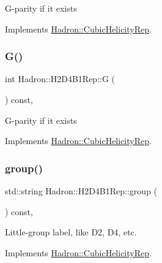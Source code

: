 G-\/parity if it exists 

Implements \mbox{\hyperlink{structHadron_1_1CubicHelicityRep_a50689f42be1e6170aa8cf6ad0597018b}{Hadron\+::\+Cubic\+Helicity\+Rep}}.

\mbox{\label{structHadron_1_1H2D4B1Rep_a327c671d4dca8693f717827d478e03aa}} 
\subsubsection{\texorpdfstring{G()}{G()}\hspace{0.1cm}{\footnotesize\ttfamily [2/2]}}
{\footnotesize\ttfamily int Hadron\+::\+H2\+D4\+B1\+Rep\+::G (\begin{DoxyParamCaption}{ }\end{DoxyParamCaption}) const\hspace{0.3cm}{\ttfamily [inline]}, {\ttfamily [virtual]}}

G-\/parity if it exists 

Implements \mbox{\hyperlink{structHadron_1_1CubicHelicityRep_a50689f42be1e6170aa8cf6ad0597018b}{Hadron\+::\+Cubic\+Helicity\+Rep}}.

\mbox{\label{structHadron_1_1H2D4B1Rep_aabf48ead894c892df15d0203bd7dc107}} 
\subsubsection{\texorpdfstring{group()}{group()}\hspace{0.1cm}{\footnotesize\ttfamily [1/3]}}
{\footnotesize\ttfamily std\+::string Hadron\+::\+H2\+D4\+B1\+Rep\+::group (\begin{DoxyParamCaption}{ }\end{DoxyParamCaption}) const\hspace{0.3cm}{\ttfamily [inline]}, {\ttfamily [virtual]}}

Little-\/group label, like D2, D4, etc. 

Implements \mbox{\hyperlink{structHadron_1_1CubicHelicityRep_a101a7d76cd8ccdad0f272db44b766113}{Hadron\+::\+Cubic\+Helicity\+Rep}}.

\mbox{\label{structHadron_1_1H2D4B1Rep_aabf48ead894c892df15d0203bd7dc107}} 
